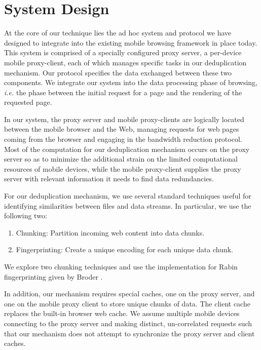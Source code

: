 \section{System Design}
\label{sec:sys_design}
At the core of our technique lies the ad hoc system and protocol we have designed to integrate into the existing mobile browsing framework in place today. This system is comprised of a specially configured proxy server, a per-device mobile proxy-client, each of which manages specific tasks in our deduplication mechanism. Our protocol specifies the data exchanged between these two components. We integrate our system into the data processing phase of browsing, \textit{i.e.} the phase between the initial request for a page and the rendering of the requested page.

In our system, the proxy server and mobile proxy-clients are logically located between the mobile browser and the Web, managing requests for web pages coming from the browser and engaging in the bandwidth reduction protocol. Most of the computation for our deduplication mechanism occurs on the proxy server so as to minimize the additional strain on the limited computational resources of mobile devices, while the mobile proxy-client supplies the proxy server with relevant information it needs to find data redundancies. 

For our deduplication mechanism, we use several standard techniques useful for identifying similarities between files and data streams. In particular, we use the following two: 
\begin{enumerate}
\item Chunking: Partition incoming web content into data chunks.
\item Fingerprinting: Create a unique encoding for each unique data chunk.
\end{enumerate}
We explore two chunking techniques and use the implementation for Rabin fingerprinting given by Broder \cite{broder}. 

In addition, our mechanism requires special caches, one on the proxy server, and one on the mobile proxy client to store unique chunks of data. The client cache replaces the built-in browser web cache. We assume multiple mobile devices connecting to the proxy server and making distinct, un-correlated requests such that our mechanism does not attempt to synchronize the proxy server and client caches.






